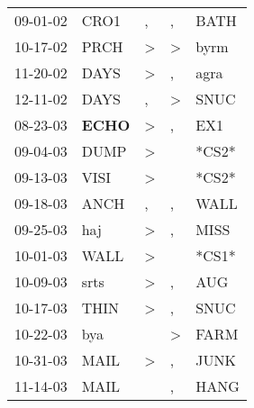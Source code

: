 \begin{supertabular}{p{0.07\textwidth}p{0.06\textwidth}p{0.02\textwidth}p{0.02\textwidth}p{0.06\textwidth}}
 09-01-02\textsuperscript{} &           CRO1\textsuperscript{} &                , &                , &           BATH\textsuperscript{} \\
 10-17-02\textsuperscript{} &           PRCH\textsuperscript{} &     \textgreater &     \textgreater &           byrm\textsuperscript{} \\
 11-20-02\textsuperscript{} &           DAYS\textsuperscript{} &     \textgreater &                , &           agra\textsuperscript{} \\
 12-11-02\textsuperscript{} &           DAYS\textsuperscript{} &                , &     \textgreater &           SNUC\textsuperscript{} \\
 08-23-03\textsuperscript{} &  \textbf{ECHO\textsuperscript{}} &     \textgreater &                , &            EX1\textsuperscript{} \\
 09-04-03\textsuperscript{} &           DUMP\textsuperscript{} &     \textgreater &                  &                            *CS2* \\
 09-13-03\textsuperscript{} &           VISI\textsuperscript{} &     \textgreater &                  &                            *CS2* \\
 09-18-03\textsuperscript{} &           ANCH\textsuperscript{} &                , &                , &           WALL\textsuperscript{} \\
 09-25-03\textsuperscript{} &            haj\textsuperscript{} &     \textgreater &                , &           MISS\textsuperscript{} \\
 10-01-03\textsuperscript{} &           WALL\textsuperscript{} &     \textgreater &                  &                            *CS1* \\
 10-09-03\textsuperscript{} &           srts\textsuperscript{} &     \textgreater &                , &            AUG\textsuperscript{} \\
 10-17-03\textsuperscript{} &           THIN\textsuperscript{} &     \textgreater &                , &           SNUC\textsuperscript{} \\
 10-22-03\textsuperscript{} &            bya\textsuperscript{} &                  &     \textgreater &           FARM\textsuperscript{} \\
 10-31-03\textsuperscript{} &           MAIL\textsuperscript{} &     \textgreater &                , &           JUNK\textsuperscript{} \\
 11-14-03\textsuperscript{} &           MAIL\textsuperscript{} &                  &                , &           HANG\textsuperscript{} \\

\end{supertabular}
